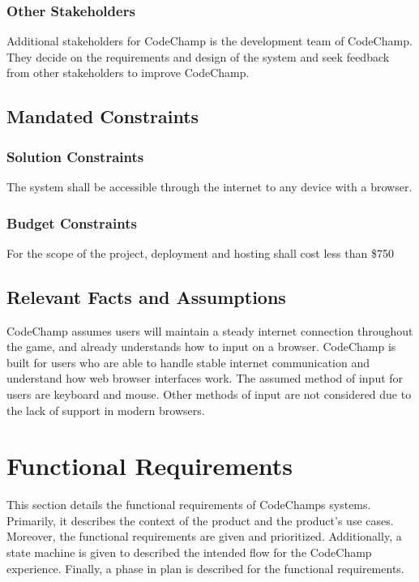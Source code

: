 \documentclass[12pt, titlepage]{article}
\begin{document}
\subsubsection{Other Stakeholders}
Additional stakeholders for CodeChamp is the development team of CodeChamp. They decide on the requirements and design of the system and seek feedback from other stakeholders to improve CodeChamp.

\subsection{Mandated Constraints}

\subsubsection{Solution Constraints}
The system shall be accessible through the internet to any device with a
browser.

\subsubsection{Budget Constraints}
For the scope of the project, deployment and hosting shall cost less than \$750

\subsection{Relevant Facts and Assumptions}
CodeChamp assumes users will maintain a steady internet connection throughout the game, and already understands how to input on a browser. CodeChamp is built for users who are able to handle stable internet communication and understand how web browser interfaces work. The assumed method of input for users are keyboard and mouse. Other methods of input are not considered due to the lack of support in modern browsers.

\section{Functional Requirements}

This section details the functional requirements of CodeChamps systems. Primarily, it describes the context of the product and the product's use cases. Moreover, the functional requirements are given and prioritized. Additionally, a state machine is given to described the intended flow for the CodeChamp experience. Finally, a phase in plan is described for the functional requirements.
\end{document}
